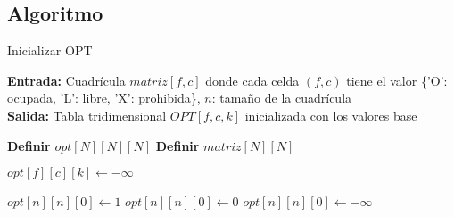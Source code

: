 \subsection{Algoritmo}
\begin{algorithm}
    \caption{Inicializar OPT}
    \label{alg:inicializarOPT}
    \textbf{Entrada:} Cuadrícula $matriz[f, c]$ donde cada celda $(f, c)$ tiene el valor \{'O': ocupada, 'L': libre, 'X': prohibida\}, $n$: tamaño de la cuadrícula \\
    \textbf{Salida:} Tabla tridimensional $OPT[f, c, k]$ inicializada con los valores base

    \begin{algorithmic}[1]
        \State \textbf{Definir} $opt[N][N][N]$ 
        \State \textbf{Definir} $matriz[N][N]$ 

         
             
                 
                    \State $opt[f][c][k] \gets -\infty$ 
                \EndFor
            \EndFor
        \EndFor
        
            \State $opt[n][n][0] \gets 1$ 
            \State $opt[n][n][0] \gets 0$ 
        \Else
            \State $opt[n][n][0] \gets -\infty$ 
        \EndIf
    \end{algorithmic}
\end{algorithm}



